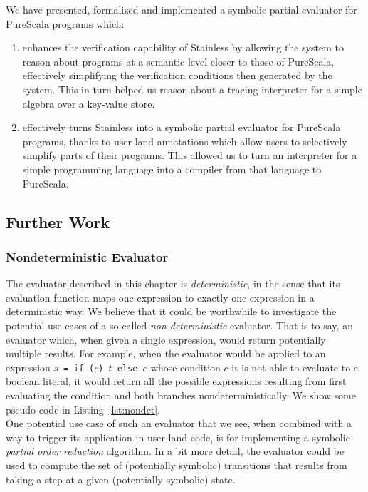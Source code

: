 \documentclass[a4paper,twoside]{article}
\newcommand{\RefCode}[1]{Listing~\ref{#1}}
\newcommand{\stt}[1]{\texttt{\small{#1}}}
\begin{document}
We have presented, formalized and implemented a symbolic partial evaluator for PureScala programs which:

\begin{enumerate}
\item enhances the verification capability of Stainless by allowing the system to reason about programs at a semantic level closer to those of PureScala, effectively simplifying the verification conditions then generated by the system. This in turn helped us reason about a tracing interpreter for a simple algebra over a key-value store.
\item effectively turns Stainless into a symbolic partial evaluator for PureScala programs, thanks to user-land annotations which allow users to selectively simplify parts of their programs. This allowed us to turn an interpreter for a simple programming language into a compiler from that language to PureScala.
\end{enumerate}

\subsection{Further Work}
\label{sym-further}

\subsubsection*{Nondeterministic Evaluator}

The evaluator described in this chapter is \textit{deterministic}, in the sense that its evaluation function maps one expression to exactly one expression in a deterministic way. We believe that it could be worthwhile to investigate the potential use cases of a so-called \textit{non-deterministic} evaluator. That is to say, an evaluator which, when given a single expression, would return potentially multiple results. For example, when the evaluator would be applied to an expression \stt{$s$ = if ($c$) $t$ else $e$} whose condition $c$ it is not able to evaluate to a boolean literal, it would return all the possible expressions resulting from first evaluating the condition and both branches nondeterministically. We show some pseudo-code in \RefCode{lst:nondet}.\\

One potential use case of such an evaluator that we see, when combined with a way to trigger its application in user-land code, is for implementing a symbolic \textit{partial order reduction} algorithm. In a bit more detail, the evaluator could be used to compute the set of (potentially symbolic) transitions that results from taking a step at a given (potentially symbolic) state.
\end{document}
